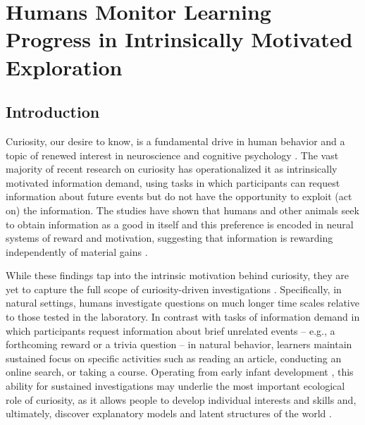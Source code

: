 \chapter{Humans Monitor Learning Progress in Intrinsically Motivated Exploration}\label{ch:ncomm}

\section{Introduction}
    Curiosity, our desire to know, is a fundamental drive in human behavior and a topic of renewed interest in neuroscience and cognitive psychology \cite{gottlieb2013information,kidd2015psychology}. The vast majority of recent research on curiosity has operationalized it as intrinsically motivated information demand, using tasks in which participants can request information about future events but do not have the opportunity to exploit (act on) the information. The studies have shown that humans and other animals seek to obtain information as a good in itself and this preference is encoded in neural systems of reward and motivation, suggesting that information is rewarding independently of material gains \cite{duan2020effect,lau2020shared,kang2009wick,bromberg2009midbrain}.

    While these findings tap into the intrinsic motivation behind curiosity, they are yet to capture the full scope of curiosity-driven investigations \cite{gottlieb2018towards}. Specifically, in natural settings, humans investigate questions on much longer time scales relative to those tested in the laboratory.  In contrast with  tasks of information demand in which participants request information about brief unrelated events – e.g., a forthcoming reward or a trivia question – in natural behavior, learners maintain sustained focus on specific activities such as reading an article, conducting an online search, or taking a course. Operating from early infant development \cite{Bazhydai21}, this ability for sustained investigations may underlie the most important ecological role of curiosity, as it allows people to develop individual interests and skills and, ultimately, discover explanatory models and latent structures of the world \cite{hidi2019interest,schwartenbeck2019computational,dubey2019reconciling}.
    
